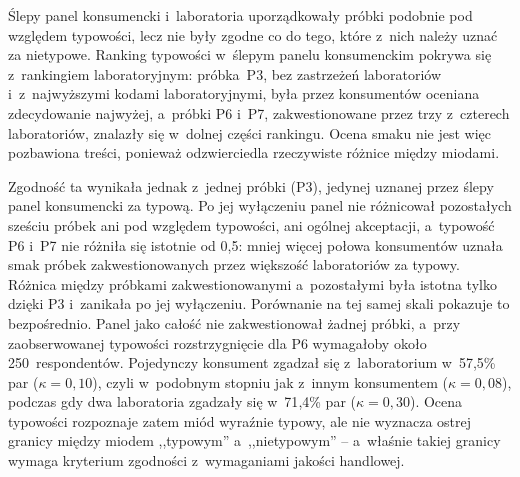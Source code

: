  

Ślepy panel konsumencki i~laboratoria uporządkowały próbki podobnie pod względem
typowości, lecz nie były zgodne co do tego, które z~nich należy uznać za
nietypowe. Ranking typowości w~ślepym panelu konsumenckim
pokrywa się z~rankingiem laboratoryjnym: próbka~P3, bez zastrzeżeń
laboratoriów i~z~najwyższymi kodami laboratoryjnymi, była przez
konsumentów oceniana zdecydowanie najwyżej, a~próbki P6 i~P7, zakwestionowane
przez trzy z~czterech laboratoriów, znalazły się w~dolnej części
rankingu. Ocena smaku nie jest więc pozbawiona treści, ponieważ
odzwierciedla rzeczywiste różnice między miodami.

Zgodność ta wynikała jednak z~jednej próbki (P3), jedynej uznanej przez
ślepy panel konsumencki za typową. Po jej wyłączeniu panel nie różnicował pozostałych sześciu próbek ani pod względem typowości,
ani ogólnej akceptacji, a~typowość P6 i~P7 nie różniła się istotnie
od 0{,}5: mniej więcej połowa konsumentów uznała smak próbek
zakwestionowanych przez większość laboratoriów za typowy. Różnica między
próbkami zakwestionowanymi a~pozostałymi była istotna tylko dzięki P3
i~zanikała po jej wyłączeniu. Porównanie na tej samej skali pokazuje to
bezpośrednio. Panel jako całość nie zakwestionował żadnej próbki, a~przy
zaobserwowanej typowości rozstrzygnięcie dla P6 wymagałoby około
250~respondentów. Pojedynczy konsument zgadzał się z~laboratorium
w~57{,}5\% par ($\kappa = 0{,}10$), czyli w~podobnym stopniu jak z~innym
konsumentem ($\kappa = 0{,}08$), podczas gdy dwa laboratoria zgadzały się
w~71{,}4\% par ($\kappa = 0{,}30$). Ocena typowości rozpoznaje
zatem miód wyraźnie typowy, ale nie wyznacza ostrej granicy między miodem
,,typowym'' a~,,nietypowym'' -- a~właśnie takiej granicy wymaga kryterium
zgodności z~wymaganiami jakości handlowej.
